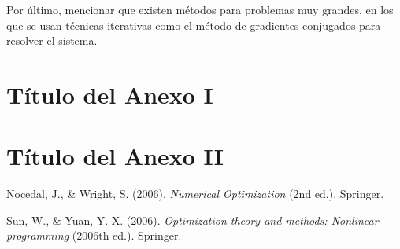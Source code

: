 \documentclass[11pt,a4paper]{book}
\theoremstyle{definition}
\theoremstyle{remark}
\begin{document}
Por último, mencionar que existen métodos para problemas muy grandes, en los que se usan técnicas iterativas como el método de gradientes conjugados para resolver el sistema.

\appendix
\renewcommand{\thechapter}{\Roman{chapter}}
\chapter{Título del Anexo I}


\chapter{Título del Anexo II}

\backmatter

\begin{thebibliography}{99}

%


 Nocedal, J., \& Wright, S. (2006). \emph{Numerical Optimization} (2nd ed.). Springer.

 Sun, W., \& Yuan, Y.-X. (2006). \emph{Optimization theory and methods: Nonlinear programming} (2006th ed.). Springer.

%
\end{thebibliography}
\end{document}
